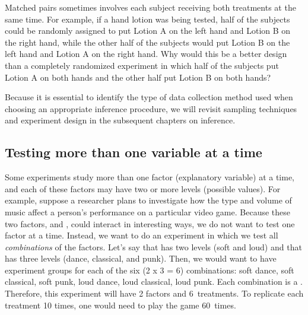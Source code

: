 \begin{exercisewrap}
\begin{nexercise}
Matched pairs sometimes involves each subject receiving both treatments at the same time. For example, if a hand lotion was being tested, half of the subjects could be randomly assigned to put Lotion A on the left hand and Lotion B on the right hand, while the other half of the subjects would put Lotion B on the left hand and Lotion A on the right hand. Why would this be a better design than a completely randomized experiment in which half of the subjects put Lotion A on both hands and the other half put Lotion B on both hands?\footnotemark\end{nexercise}
\end{exercisewrap}

Because it is essential to identify the type of data collection method used when choosing an appropriate inference procedure, we will revisit sampling techniques and experiment design in the subsequent chapters on inference.





\subsection{Testing more than one variable at a time}

Some experiments study more than one factor (explanatory variable) at a time, and each of these factors may have two or more levels (possible values). For example, suppose a researcher plans to investigate how the type and volume of music affect a person's performance on a particular video game. Because these two factors,  and , could interact in interesting ways, we do not want to test one factor at a time. %
Instead, we want to do an experiment in which
we test all \emph{combinations} of the factors. Let's say that  has two levels (soft and loud) and that  has three levels (dance, classical, and punk). Then, we would want to have experiment groups for each of the six (2 x 3 = 6) combinations: soft dance, soft classical, soft punk, loud dance, loud classical, loud punk. Each combination is a . Therefore, this experiment will have 2 factors and 6~treatments. To replicate each treatment 10 times, one would need to play the game 60~times.

